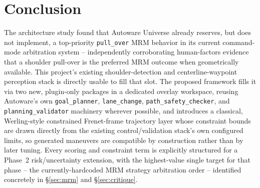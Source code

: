 \documentclass[11pt]{article}
\newcommand{\code}[1]{\texttt{#1}}
\newcommand{\pkg}[1]{\texttt{#1}}
\begin{document}
\section{Conclusion}
\label{sec:conclusion}

The architecture study found that Autoware Universe already reserves, but does not implement, a
top-priority \code{pull\_over} MRM behavior in its current command-mode arbitration system --
independently corroborating human-factors evidence \cite{vu2023mrm} that a shoulder pull-over is
the preferred MRM outcome when geometrically available. This project's existing shoulder-detection
and centerline-waypoint perception stack is directly usable to fill that slot. The proposed
framework fills it via two new, plugin-only packages in a dedicated overlay workspace, reusing
Autoware's own \pkg{goal\_planner}, \pkg{lane\_change}, \pkg{path\_safety\_checker}, and
\pkg{planning\_validator} machinery wherever possible, and introduces a classical, Werling-style
constrained Frenet-frame trajectory layer whose constraint bounds are drawn directly from the
existing control/validation stack's own configured limits, so generated maneuvers are compatible by
construction rather than by later tuning. Every scoring and constraint term is explicitly structured
for a Phase~2 risk/uncertainty extension, with the highest-value single target for that phase --
the currently-hardcoded MRM strategy arbitration order -- identified concretely in
\S\ref{sec:mrm} and \S\ref{sec:critique}.
\end{document}
